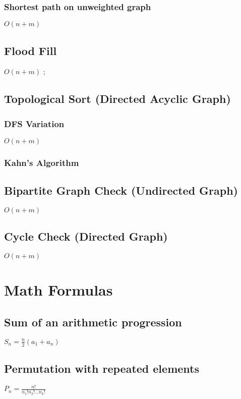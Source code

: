 \documentclass{article}
\begin{document}
\subsubsection{Shortest path on unweighted graph}
$O(n+m)$


\subsection{Flood Fill}
$O(n+m)$
;

\subsection{Topological Sort (Directed Acyclic Graph)}
\subsubsection{DFS Variation}
$O(n+m)$


\subsubsection{Kahn's Algorithm}


\subsection{Bipartite Graph Check (Undirected Graph)}
$O(n+m)$


\subsection{Cycle Check (Directed Graph)}
$O(n+m)$


\section{Math Formulas}
\subsection{Sum of an arithmetic progression}
$S_n = \frac{n}{2}(a_1 + a_n)$

\subsection{Permutation with repeated elements}
$P_n = \frac{n!}{n_1!n_2!...n_k!}$ 
\end{document}
